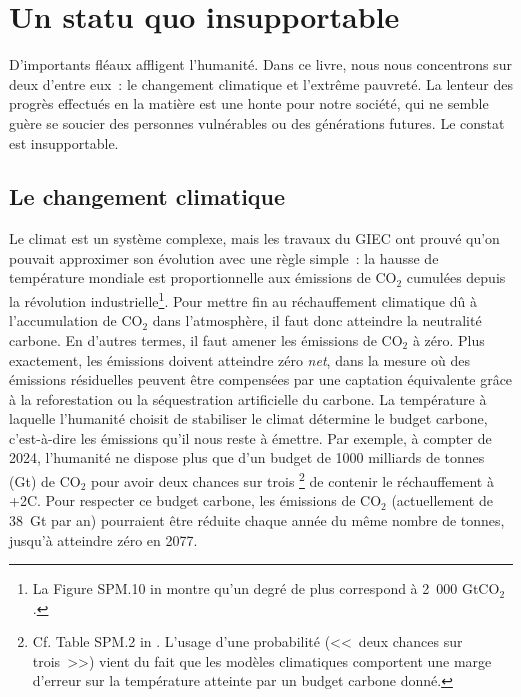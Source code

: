 \documentclass[a5paper,french,openany]{memoir}
\begin{document}
\chapter{Un statu quo insupportable\label{ch:statu_quo}}

D'importants fléaux affligent l'humanité. Dans ce livre, nous nous 
concentrons sur deux d'entre eux~: le changement climatique et l'extrême pauvreté. La lenteur des progrès effectués en la matière est une honte pour notre société, qui ne semble guère se soucier des personnes vulnérables ou des générations futures. Le constat est insupportable.

\section{Le changement climatique}

Le climat est un système complexe, mais les travaux du GIEC ont prouvé qu'on pouvait approximer son évolution avec une règle simple~: la hausse de température mondiale est proportionnelle aux émissions de CO$_\text{2}$ cumulées depuis la révolution industrielle\footnote{La Figure SPM.10 in \citet{ipcc_climate_2021} montre qu'un degré de plus correspond à 2~000 GtCO$_\text{2}$.}. 
Pour mettre fin au réchauffement climatique dû à l'accumulation de CO$_\text{2}$ dans l'atmosphère, il faut donc atteindre la neutralité carbone. En d'autres termes, il faut amener les émissions de CO$_\text{2}$ à zéro. Plus exactement, les émissions doivent atteindre zéro \textit{net}, dans la mesure où des émissions résiduelles peuvent être compensées par une captation équivalente grâce à la reforestation ou la séquestration artificielle du carbone. La température à laquelle l'humanité choisit de stabiliser le climat détermine le budget carbone, c'est-à-dire les émissions qu'il nous reste à émettre. Par exemple, à compter de 2024, l'humanité ne dispose plus que d'un budget de 1000 milliards de tonnes (Gt) de CO$_\text{2}$ pour avoir deux chances sur trois%
\footnote{Cf. Table SPM.2 in \citet{ipcc_climate_2021}. L'usage d'une probabilité (<<~deux chances sur trois~>>) vient du fait que les modèles climatiques comportent une marge d'erreur sur la température atteinte par un budget carbone donné.} de contenir le réchauffement à +2\textdegree{}C. 
Pour respecter ce budget carbone, les émissions de CO$_\text{2}$ (actuellement de 38~Gt par an) pourraient être réduite chaque année du même nombre de tonnes, jusqu'à atteindre zéro en 2077.  %
\end{document}
